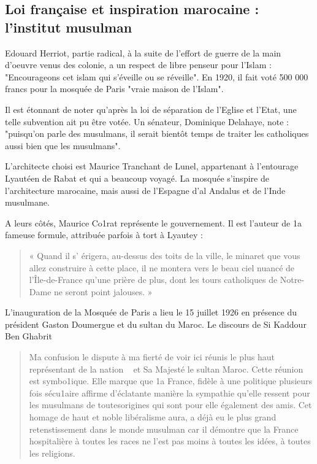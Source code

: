 \subsection{Loi française et inspiration marocaine : l'institut musulman}
Edouard Herriot, partie radical, à la suite de l'effort de guerre de la main d'oeuvre venus des colonie, a un respect de libre penseur pour l'Islam : "Encourageons cet islam qui s'éveille ou se réveille". En 1920, il fait voté 500 000 francs pour la mosquée de Paris "vraie maison de l'Islam".

Il est étonnant de noter qu'après la loi de séparation de l'Eglise et l'Etat, une telle subvention ait pu être votée. Un sénateur, Dominique Delahaye, note : "puisqu'on parle des musulmans, il serait bientôt temps de traiter les catholiques aussi bien que les musulmans".

L'architecte choisi est Maurice Tranchant de Lunel, appartenant à l'entourage Lyautéen de Rabat et qui a beaucoup voyagé. La mosquée s'inspire de l'architecture marocaine, mais aussi de l'Espagne d'al Andalus et de l'Inde musulmane. 

A leurs côtés,
Maurice Co1rat représente le gouvernement. Il est l'auteur de
1a fameuse formule, attribuée parfois à tort à Lyautey :
\begin{quote}
    « Quand
il s' érigera, au-dessus des toits de la ville, le minaret que vous
allez construire à cette place, il ne montera vers le beau ciel
nuancé de l'Île-de-France qu'une prière de plus, dont les tours
catholiques de Notre-Dame ne seront point jalouses. »
\end{quote}

L'inauguration de la Mosquée de Paris a lieu le 15 juillet 1926 en présence du président Gaston Doumergue et du sultan du Maroc. Le discours de Si Kaddour Ben Ghabrit 
\begin{quote}
    
Ma confusion le dispute à
ma fierté de voir ici réunis le plus haut représentant de la nation
~ et Sa Majesté le sultan Maroc. Cette réunion est symbo1ique. Elle marque que 1a France, fidèle à une politique plusieurs
fois sécu1aire affirme d'éclatante manière la sympathie qu'elle ressent pour les musulmans de toutesorigines qui sont pour elle également des amis. Cet homage de haut et noble libéralisme aura, a déjà eu le plus grand retenstissement dans le monde musulman car il démontre que la France hospitalière à toutes les races ne l'est pas moins à toutes les idées, à toutes les religions. \end{quote}

